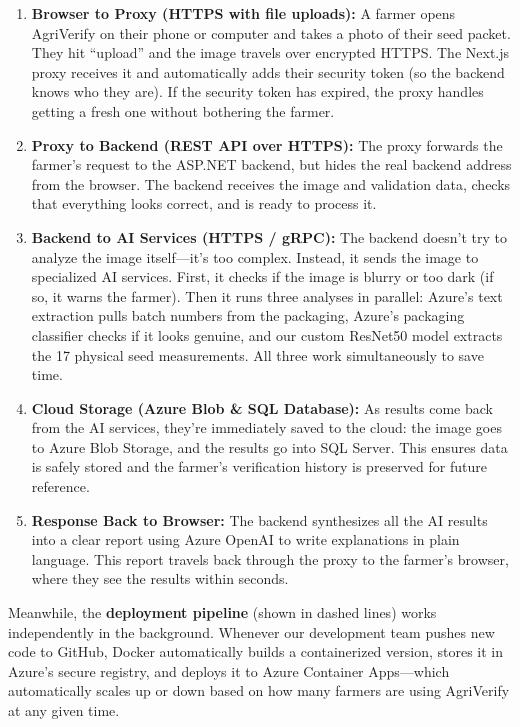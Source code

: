 \begin{enumerate}
    \item \textbf{Browser to Proxy (HTTPS with file uploads):} A farmer opens AgriVerify on their phone or computer and takes a photo of their seed packet. They hit ``upload'' and the image travels over encrypted HTTPS. The Next.js proxy receives it and automatically adds their security token (so the backend knows who they are). If the security token has expired, the proxy handles getting a fresh one without bothering the farmer.
    
    \item \textbf{Proxy to Backend (REST API over HTTPS):} The proxy forwards the farmer's request to the ASP.NET backend, but hides the real backend address from the browser. The backend receives the image and validation data, checks that everything looks correct, and is ready to process it.
    
    \item \textbf{Backend to AI Services (HTTPS / gRPC):} The backend doesn't try to analyze the image itself---it's too complex. Instead, it sends the image to specialized AI services. First, it checks if the image is blurry or too dark (if so, it warns the farmer). Then it runs three analyses in parallel: Azure's text extraction pulls batch numbers from the packaging, Azure's packaging classifier checks if it looks genuine, and our custom ResNet50 model extracts the 17 physical seed measurements. All three work simultaneously to save time.
    
    \item \textbf{Cloud Storage (Azure Blob \& SQL Database):} As results come back from the AI services, they're immediately saved to the cloud: the image goes to Azure Blob Storage, and the results go into SQL Server. This ensures data is safely stored and the farmer's verification history is preserved for future reference.
    
    \item \textbf{Response Back to Browser:} The backend synthesizes all the AI results into a clear report using Azure OpenAI to write explanations in plain language. This report travels back through the proxy to the farmer's browser, where they see the results within seconds.
\end{enumerate}

Meanwhile, the \textbf{deployment pipeline} (shown in dashed lines) works independently in the background. Whenever our development team pushes new code to GitHub, Docker automatically builds a containerized version, stores it in Azure's secure registry, and deploys it to Azure Container Apps---which automatically scales up or down based on how many farmers are using AgriVerify at any given time.